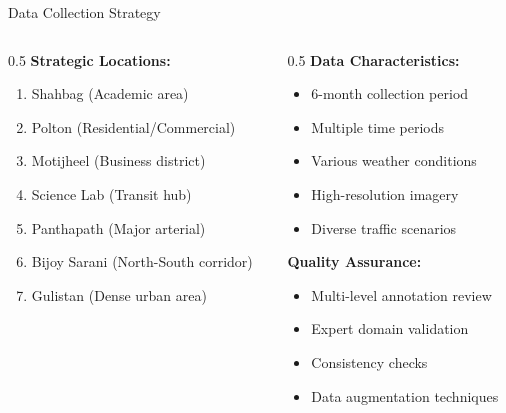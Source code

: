 \documentclass[10pt]{beamer}
\begin{document}
\begin{frame}{Data Collection Strategy}
    \begin{columns}
        \begin{column}{0.5\textwidth}
            \textbf{Strategic Locations:}
            \begin{enumerate}
                \item Shahbag (Academic area)
                \item Polton (Residential/Commercial)
                \item Motijheel (Business district)
                \item Science Lab (Transit hub)
                \item Panthapath (Major arterial)
                \item Bijoy Sarani (North-South corridor)
                \item Gulistan (Dense urban area)
            \end{enumerate}
        \end{column}
        \begin{column}{0.5\textwidth}
            \textbf{Data Characteristics:}
            \begin{itemize}
                \item 6-month collection period
                \item Multiple time periods
                \item Various weather conditions
                \item High-resolution imagery
                \item Diverse traffic scenarios
            \end{itemize}
            
            \vspace{0.3cm}
            \textbf{Quality Assurance:}
            \begin{itemize}
                \item Multi-level annotation review
                \item Expert domain validation
                \item Consistency checks
                \item Data augmentation techniques
            \end{itemize}
        \end{column}
    \end{columns}
\end{frame}
\end{document}
